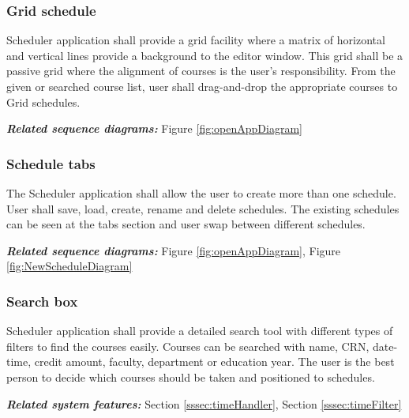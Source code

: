 \documentclass[twoside,letterpaper]{article}
\begin{document}
\subsubsection[Grid schedules
]{\rmfamily\bfseries\color{black}
Grid schedule}

{\color{black}
Scheduler application shall provide a grid facility where a matrix of horizontal and vertical lines provide a background to the editor window. This grid shall be a passive grid where the alignment of courses is the user's responsibility. From the given or searched course list, user shall drag-and-drop the appropriate courses to Grid schedules. }
	
\smallskip

{\color{black}
\emph{\textbf{Related sequence diagrams:}} Figure \ref{fig:openAppDiagram}}

\subsubsection[Schedule tabs
]{\rmfamily\bfseries\color{black}
	Schedule tabs}

{\color{black}
	The Scheduler application shall allow the user to create more than one schedule. User shall save, load, create, rename and delete schedules. The existing schedules can be seen at the tabs section and user swap between different schedules.}
	
\smallskip

{\color{black}
\emph{\textbf{Related sequence diagrams:}} Figure \ref{fig:openAppDiagram}, Figure \ref{fig:NewScheduleDiagram}}

\subsubsection[Search box
]{\rmfamily\bfseries\color{black}
	Search box}

{\color{black}
	Scheduler application shall provide a detailed search tool with different types of filters to find the courses easily. Courses can be searched with name, CRN, date-time, credit amount, faculty, department or education year. The user is the best person to decide which courses should be taken and positioned to schedules.}
	
\smallskip

{\color{black}
\emph{\textbf{Related system features:}} Section \ref{sssec:timeHandler}, Section \ref{sssec:timeFilter}}
	
\end{document}
